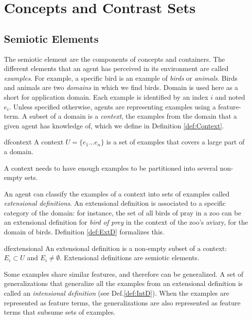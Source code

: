 \section{Concepts and Contrast Sets}\label{sec:Formalism}

\subsection{Semiotic Elements}\label{sec:SemEl}

The semiotic element are the components of concepts and containers. The different elements that an agent has perceived in its environment are called \emph{examples}. For example, a specific bird is an example of \emph{birds} or \emph{animals}. Birds and animals are two \emph{domains} in which we find birds. Domain is used here as a short for application domain.  Each example is identified by an index $i$ and noted $e_{i}$. Unless specified otherwise, agents are representing examples using a feature-term. A subset of a domain is a \emph{context}, the examples from the domain that a given agent has knowledge of, which we define in Definition \ref{def:Context}.

\begin{restatable}[Context]{df}{context}
\label{def:Context}
A context $U = \{ e_{1} \ldots e_{n} \}$ is a set of examples that covers a large part of a domain. 
\end{restatable}
A context needs to have enough examples to be partitioned into several non-empty sets.

An agent can classify the examples of a context into sets of examples called \emph{extensional definitions}. An extensional definition is associated to a specific category of the domain: for instance, the set of all birds of pray in a zoo can be an extensional definition for \emph{bird of prey} in the context of the zoo's aviary, for the domain of birds. Definition \ref{def:ExtD} formalizes this.

\begin{restatable}{df}{extensional}
\label{def:ExtD}
An extensional definition is a non-empty subset of a context: $E_{i} \subset U$ and $E_{i} \neq \emptyset$. Extensional definitions are semiotic elements.
\end{restatable}

Some examples share similar features, and therefore can be generalized. A set of generalizations that generalize all the examples from an extensional definition is called an \emph{intensional definition} (see Def.\ref{def:IntD}). When the examples are represented as feature terms, the generalizations are also represented as feature terms that subsume sets of examples.

